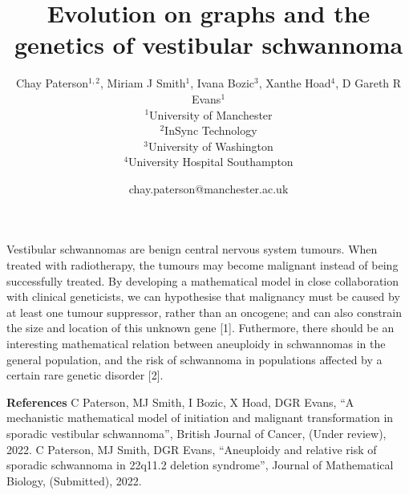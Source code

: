 \documentclass[a4paper]{article}
\title{Evolution on graphs and the genetics of vestibular schwannoma}
\author{Chay Paterson$^{1,2}$, Miriam J Smith$^{1}$, Ivana Bozic$^{3}$, Xanthe
Hoad$^{4}$, D Gareth R Evans$^{1}$  \\
        \small $^{1}$University of Manchester \\
        \small $^{2}$InSync Technology \\
        \small $^{3}$University of Washington \\
        \small $^{4}$University Hospital Southampton \\
}
\date{chay.paterson@manchester.ac.uk} %
\begin{document}
\maketitle

Vestibular schwannomas are benign central nervous system tumours. When treated
with radiotherapy, the tumours may become malignant instead of being
successfully treated. By developing a mathematical model in close collaboration
with clinical geneticists, we can hypothesise that malignancy must be caused by
at least one tumour suppressor, rather than an oncogene; and can also constrain
the size and location of this unknown gene [1]. Futhermore, there should be an
interesting mathematical relation between aneuploidy in schwannomas in the
general population, and the risk of schwannoma in populations affected by a certain rare
genetic disorder [2].


{\bf References}
\newline
[1] C Paterson, MJ Smith, I Bozic, X Hoad, DGR Evans, ``A mechanistic mathematical model of initiation and malignant transformation in sporadic vestibular schwannoma'', British Journal of
Cancer, (Under review), 2022.
\newline
[2] C Paterson, MJ Smith, DGR Evans, ``Aneuploidy and relative risk of sporadic
schwannoma in 22q11.2 deletion syndrome'', Journal of Mathematical Biology,
(Submitted), 2022.
\end{document}
